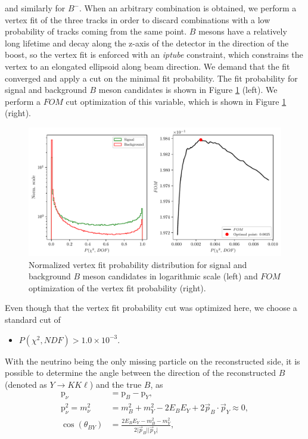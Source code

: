 \documentclass[oneside,a4paper,openany,12pt]{scrbook}
\newcommand {\E}[1]{\times 10^{#1}}
\begin{document}
and similarly for $B^-$. When an arbitrary combination is obtained, we perform a vertex fit of the three tracks in order to discard combinations with a low probability of tracks coming from the same point. $B$ mesons have a relatively long lifetime and decay along the z-axis of the detector in the direction of the boost, so the vertex fit is enforced with an \textit{iptube} constraint, which constrains the vertex to an elongated ellipsoid along beam direction. We demand that the fit converged and apply a cut on the minimal fit probability. The fit probability for signal and background $B$ meson candidates is shown in Figure \ref{fig:vtx} (left). We perform a $FOM$ cut optimization of this variable, which is shown in Figure \ref{fig:vtx} (right).

\begin{figure}[H]
\centering
\captionsetup{width=0.8\linewidth}
\includegraphics[width=\linewidth]{fig/VTX}
\caption{Normalized vertex fit probability distribution for signal and background $B$ meson candidates in logarithmic scale (left) and $FOM$ optimization of the vertex fit probability (right).}
\label{fig:vtx}
\end{figure}

Even though that the vertex fit probability cut was optimized here, we choose a standard cut of
\begin{itemize}
\item $P(\chi^2,NDF) > 1.0\E{-3}$.
\end{itemize}

With the neutrino being the only missing particle on the reconstructed side, it is possible to determine the angle between the direction of the reconstructed $B$ (denoted as $Y \to K K \ell$) and the true $B$, as
\begin{align}
\mathrm{p}_\nu &= \mathrm{p}_B - \mathrm{p}_{Y}, \\
\label{eq:massnu}
\mathrm{p}_\nu^2 = m_\nu^2 &= m_B^2 + m_Y^2 - 2E_BE_Y + 2\vec{p}_B \cdot \vec{p}_Y \approx 0, \\ 
\label{eq:cosby}
\cos \left(\theta_{BY}\right) &= \frac{2E_BE_Y - m_B^2 - m_Y^2}{2\vert \vec{p}_B \vert \vert \vec{p}_Y\vert},
\end{align} 
\end{document}
